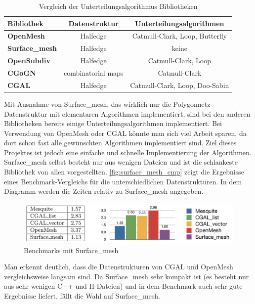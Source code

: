 \begin{table}
\center
\caption{Vergleich der Unterteilungsalgorithmus Bibliotheken}
\begin{tabular}{l|c|c}
\textbf{Bibliothek} & \textbf{Datenstruktur} & \textbf{Unterteilungsalgorithmen}\\
\hline
\textbf{OpenMesh} & Halfedge & Catmull-Clark, Loop, Butterfly\\
\textbf{Surface\_mesh} & Halfedge & keine\\
\textbf{OpenSubdiv} & Halfedge & Catmull-Clark, Loop\\
\textbf{CGoGN} & combinatorial maps & Catmull-Clark\\
\textbf{CGAL} & Halfedge & Catmull-Clark, Loop, Doo-Sabin\\
\end{tabular}
\label{tab:sd_bib}
\end{table}

Mit Ausnahme von Surface\_mesh, das wirklich nur die Polygonnetz-Datenstruktur mit elementaren Algorithmen implementiert, sind bei den anderen Bibliotheken bereits
einige Unterteilungsalgorithmen implementiert.
Bei Verwendung von OpenMesh oder CGAL könnte man sich viel Arbeit sparen, da dort schon fast alle gewünschten Algorithmen implementiert sind.
Ziel dieses Projektes ist jedoch eine einfache und schnelle Implementierung der Algorithmen.
Surface\_mesh selbst besteht nur aus wenigen Dateien und ist die schlankeste Bibliothek von allen vorgestellten.
\autoref{fig:surface_mesh_cmp} zeigt die Ergebnisse eines Benchmark-Vergleichs für die unterschiedlichen Datenstrukturen.
In dem Diagramm werden die Zeiten relativ zu Surface\_mesh angegeben.

\begin{figure}
  \centering
  \includegraphics[width=1.0\textwidth]{content/media/surface_mesh_cmp}
   \caption{Benchmarks mit Surface\_mesh \cite{Sieger.}}
  \label{fig:surface_mesh_cmp}
\end{figure}

Man erkennt deutlich, dass die Datenstrukturen von CGAL und OpenMesh vergleichsweise langsam sind.
Da Surface\_mesh sehr kompakt ist (es besteht nur aus sehr wenigen C++ und H-Dateien) und in dem Benchmark auch sehr gute Ergebnisse liefert, fällt die Wahl auf Surface\_mesh.


